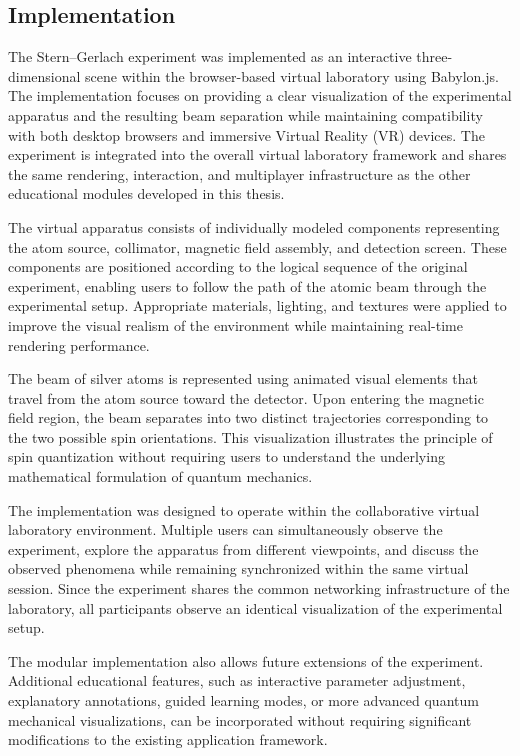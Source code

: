 \subsection{Implementation}

The Stern--Gerlach experiment was implemented as an interactive three-dimensional scene within the browser-based virtual laboratory using Babylon.js. The implementation focuses on providing a clear visualization of the experimental apparatus and the resulting beam separation while maintaining compatibility with both desktop browsers and immersive Virtual Reality (VR) devices. The experiment is integrated into the overall virtual laboratory framework and shares the same rendering, interaction, and multiplayer infrastructure as the other educational modules developed in this thesis.

The virtual apparatus consists of individually modeled components representing the atom source, collimator, magnetic field assembly, and detection screen. These components are positioned according to the logical sequence of the original experiment, enabling users to follow the path of the atomic beam through the experimental setup. Appropriate materials, lighting, and textures were applied to improve the visual realism of the environment while maintaining real-time rendering performance.

The beam of silver atoms is represented using animated visual elements that travel from the atom source toward the detector. Upon entering the magnetic field region, the beam separates into two distinct trajectories corresponding to the two possible spin orientations. This visualization illustrates the principle of spin quantization without requiring users to understand the underlying mathematical formulation of quantum mechanics.

The implementation was designed to operate within the collaborative virtual laboratory environment. Multiple users can simultaneously observe the experiment, explore the apparatus from different viewpoints, and discuss the observed phenomena while remaining synchronized within the same virtual session. Since the experiment shares the common networking infrastructure of the laboratory, all participants observe an identical visualization of the experimental setup.

The modular implementation also allows future extensions of the experiment. Additional educational features, such as interactive parameter adjustment, explanatory annotations, guided learning modes, or more advanced quantum mechanical visualizations, can be incorporated without requiring significant modifications to the existing application framework.

